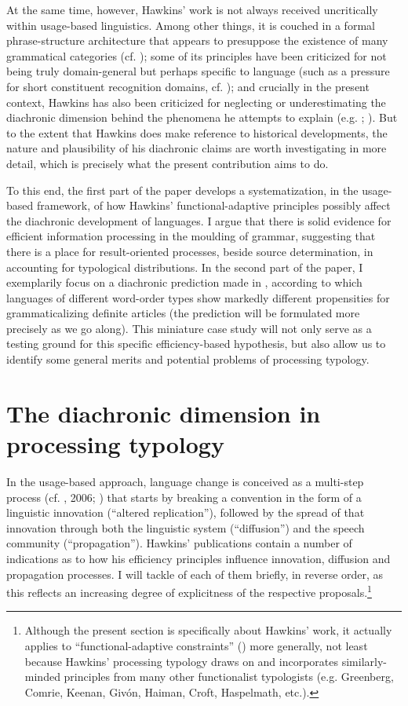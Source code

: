 \documentclass[output=paper]{langsci/langscibook}
\begin{document}
At the same time, however, Hawkins’ work is not always received uncritically within usage-based linguistics. Among other things, it is couched in a formal phrase-structure architecture that appears to presuppose the existence of many grammatical categories (cf. \citealt{Diessel2016}); some of its principles have been criticized for not being truly domain-general but perhaps specific to language (such as a pressure for short constituent recognition domains, cf. \citealt{Bybee2010}); and crucially in the present context, Hawkins has also been criticized for neglecting or underestimating the diachronic dimension behind the phenomena he attempts to explain (e.g. \citealt{Cristofaro2017}; \citealt{Collins2019 [this volume]}). But to the extent that Hawkins does make reference to historical developments, the nature and plausibility of his diachronic claims are worth investigating in more detail, which is precisely what the present contribution aims to do. 

To this end, the first part of the paper develops a systematization, in the usage-based framework, of how Hawkins’ functional-adaptive principles possibly affect the diachronic development of languages. I argue that there is solid evidence for efficient information processing in the moulding of grammar, suggesting that there is a place for result-oriented processes, beside source determination, in accounting for typological distributions. In the second part of the paper, I exemplarily focus on a diachronic prediction made in \citet{Hawkins2014}, according to which languages of different word-order types show markedly different propensities for grammaticalizing definite articles (the prediction will be formulated more precisely as we go along). This miniature case study will not only serve as a testing ground for this specific efficiency-based hypothesis, but also allow us to identify some general merits and potential problems of processing typology.

\section{ The diachronic dimension in processing typology} 

In the usage-based approach, language change is conceived as a multi-step process (cf. \citealt{Croft2000}, 2006; \citealt{Aitchison2013}) that starts by breaking a convention in the form of a linguistic innovation (“altered replication”), followed by the spread of that innovation through both the linguistic system (“diffusion”) and the speech community (“propagation”). Hawkins’ publications contain a number of indications as to how his efficiency principles influence innovation, diffusion and propagation processes. I will tackle of each of them briefly, in reverse order, as this reflects an increasing degree of explicitness of the respective proposals.\footnote{Although the present section is specifically about Hawkins’ work, it actually applies to “functional-adaptive constraints” (\citealt{Haspelmath2019 [this volume]}) more generally, not least because Hawkins’ processing typology draws on and incorporates similarly-minded principles from many other functionalist typologists (e.g. Greenberg, Comrie, Keenan, Givón, Haiman, Croft, Haspelmath, etc.).}
\end{document}
